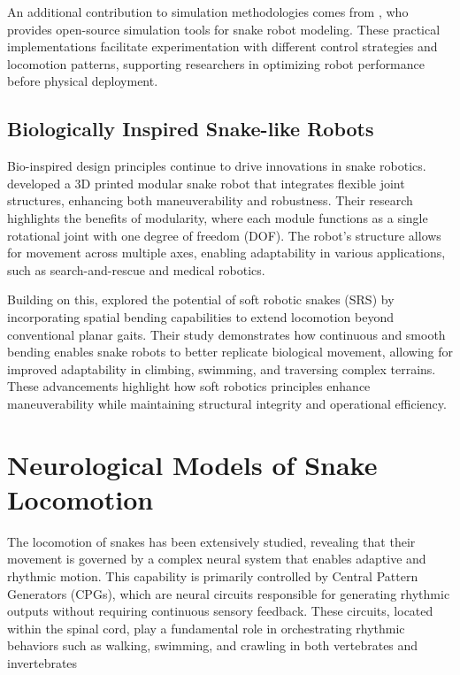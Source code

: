 \documentclass[12pt,a4paper]{report}
\begin{document}
An additional contribution to simulation methodologies comes from \textcite{yogesh2023snake}, who provides open-source simulation tools for snake robot modeling. These practical implementations facilitate experimentation with different control strategies and locomotion patterns, supporting researchers in optimizing robot performance before physical deployment.

\subsection{Biologically Inspired Snake-like Robots}
Bio-inspired design principles continue to drive innovations in snake robotics. \textcite{Mohammed2016} developed a 3D printed modular snake robot that integrates flexible joint structures, enhancing both maneuverability and robustness. Their research highlights the benefits of modularity, where each module functions as a single rotational joint with one degree of freedom (DOF). The robot's structure allows for movement across multiple axes, enabling adaptability in various applications, such as search-and-rescue and medical robotics.

Building on this, \textcite{Arachchige2021} explored the potential of soft robotic snakes (SRS) by incorporating spatial bending capabilities to extend locomotion beyond conventional planar gaits. Their study demonstrates how continuous and smooth bending enables snake robots to better replicate biological movement, allowing for improved adaptability in climbing, swimming, and traversing complex terrains. These advancements highlight how soft robotics principles enhance maneuverability while maintaining structural integrity and operational efficiency.

\section{Neurological Models of Snake Locomotion}

The locomotion of snakes has been extensively studied, revealing that their movement is governed by a complex neural system that enables adaptive and rhythmic motion. This capability is primarily controlled by Central Pattern Generators (CPGs), which are neural circuits responsible for generating rhythmic outputs without requiring continuous sensory feedback. These circuits, located within the spinal cord, play a fundamental role in orchestrating rhythmic behaviors such as walking, swimming, and crawling in both vertebrates and invertebrates \textcite{MARDER2001R986}
\end{document}
